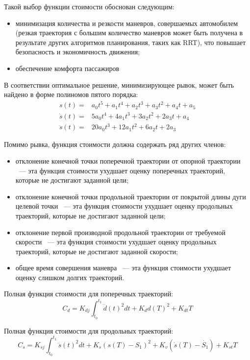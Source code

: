 Такой выбор функции стоимости обоснован следующим:
\begin{itemize}
      \item минимизация количества и резкости маневров, совершаемых автомобилем (резкая траектория
            с большим количество маневров может быть получена в результате других алгоритмов
            планирования, таких как RRT), что повышает безопасность и экономичность движения;
      \item обеспечение комфорта пассажиров
\end{itemize}

В соответствии \cite{darpa_junior_frenet_origin} оптимальное решение, минимизирующее рывок, может быть найдено в форме
полиномов пятого порядка:
\begin{eqnarray}
      s(t)        =& a_0t^5   + a_1t^4 + a_2t^3 + a_3t^2 + a_4t + a_5 \\
      \dot{s}(t)  =& 5a_0t^4  + 4a_1t^3 + 3a_2t^2 + 2a_3t + a_4 \\
      \ddot{s}(t) =& 20a_0t^3 + 12a_1t^2 + 6a_2t + 2a_3
\end{eqnarray}

Помимо рывка, функция стоимости должна содержать ряд других членов:
\begin{itemize}
      \item отклонение конечной точки поперечной траектории от опорной траектории ~--- эта функция стоимости
            ухудшает оценку поперечных траекторий, которые не достигают заданной цели;
      \item отклонение конечной точки продольной траектории от покрытой длины дуги целевой точки ~--- эта функция
            стоимости ухудшает оценку продольных траекторий, которые не достигают заданной цели;
      \item отклонение первой производной продольной траектории от требуемой скорости ~--- эта функция стоимости
            ухудшает оценку продольных траекторий, которые не достигают заданной скорости;
      \item общее время совершения маневра ~--- эта функция стоимости ухудшает оценку слишком долгих траекторий.
\end{itemize}

Полная функция стоимости для поперечных траекторий:
\begin{equation}
      C_d = K_{dj} \int_{t_0}^{t_1}{\dddot{d}(t)^2dt} + K_d d(T)^2 + K_{dt} T
\end{equation}

Полная функция стоимости для продольных траекторий:
\begin{equation}
      C_s = K_{sj} \int_{t_0}^{t_1}{\dddot{s}(t)^2dt} + K_s (s(T) - S_1)^2 + K_v (\dot{s}(T) - \dot{S_1}) + K_{st} T
\end{equation}

